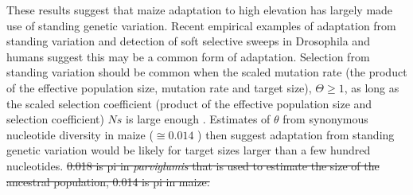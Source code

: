 These results suggest that maize adaptation to high elevation has largely made use of standing genetic variation. 
Recent empirical examples of adaptation from standing variation \cite[Reviewed in ][]{Barrett_2008_18006185,Messer_2013_24075201} and detection of soft selective sweeps in Drosophila \cite[]{Garud_2013_ArXiv} and humans \cite[]{Turchin_2012_22902787,Peter_2012_23071458} suggest this may be a common form of adaptation. 
Selection from standing variation should be common when the scaled mutation rate (the product of the effective population size, mutation rate and target size), $\Theta\geq1$, as long as the scaled selection coefficient (product of the effective population size and selection coefficient) $Ns$ is large enough \cite[]{Hermisson_2005_15716498}.
Estimates of $\theta$ from synonymous nucleotide diversity in maize ($\cong0.014$ \cite[\emph{e.g.,} ][]{Tenaillon_2004_15014173,Wright_2005_15919994,Ross-Ibarra_2009_19153259}) then suggest adaptation from standing genetic variation would be likely for target sizes larger than a few hundred nucleotides.  \st{0.018 is pi in \emph{parviglumis} that is used to estimate the size of the ancestral population,  0.014 is pi in maize.}

